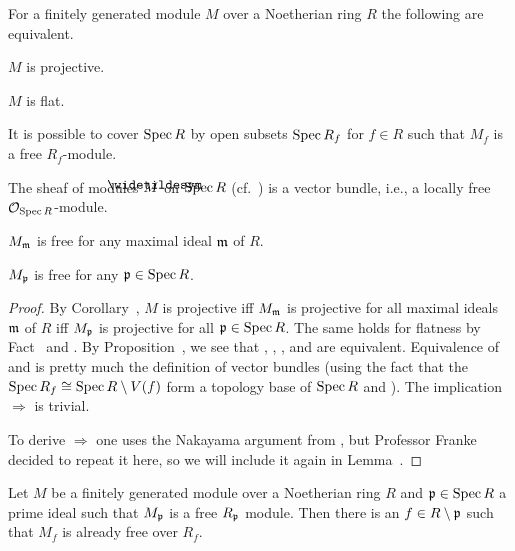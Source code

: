 \documentclass[a4paper,parskip=half,numbers=enddot, DIV=12]{scrreprt}
\begin{document}
\begin{prop}
	For a finitely generated module $M$ over a Noetherian ring $R$ the following are equivalent.
	\begin{alphanumerate}
		\item $M$ is projective.
		\item $M$ is flat.
		\item It is possible to cover $\operatorname{Spec} R$ by open subsets $\operatorname{Spec} R_{f}$ for $f\in R$ such that $M_f$ is a free $R_f$-module.
		\item The sheaf of modules $\snake{M}$ on $\operatorname{Spec} R$ (cf.\ \cite[Definition~1.4.1]{alggeo1}) is a vector bundle, i.e., a locally free $\mathcal{O}_{\operatorname{Spec} R}$-module.
		\item $M_{\mathfrak{m}}$ is free for any maximal ideal $\mathfrak{m}$ of $R$.
		\item $M_{\mathfrak{p}}$ is free for any $\mathfrak{p}\in\operatorname{Spec} R$.
	\end{alphanumerate}
\end{prop}
\begin{proof}
	By Corollary~, $M$ is projective iff $M_{\mathfrak{m}}$ is projective for all maximal ideals $\mathfrak{m}$ of $R$ iff $M_{\mathfrak{p}}$ is projective for all $\mathfrak{p}\in\operatorname{Spec} R$. The same holds for flatness by Fact~ and . By Proposition~, we see that , , , and  are equivalent. Equivalence of  and  is pretty much the definition of vector bundles (using the fact that the $\operatorname{Spec} R_f\cong \operatorname{Spec} R\setminus V(f)$ form a topology base of $\operatorname{Spec} R$ and \cite[Proposition~1.4.1]{alggeo1}). The implication  $\Rightarrow$  is trivial. 
	
	To derive  $\Rightarrow$  one uses the Nakayama argument from \cite[Corollary~1.5.1]{alg2}, but Professor Franke decided to repeat it here, so we will include it again in Lemma~.
\end{proof}
\begin{lem}
	Let $M$ be a finitely generated module over a Noetherian ring $R$ and $\mathfrak{p}\in\operatorname{Spec} R$ a prime ideal such that $M_{\mathfrak{p}}$ is a free $R_{\mathfrak{p}}$ module. Then there is an $f\in R\setminus\mathfrak{p}$ such that $M_f$ is already free over $R_f$.
\end{lem}
\end{document}

